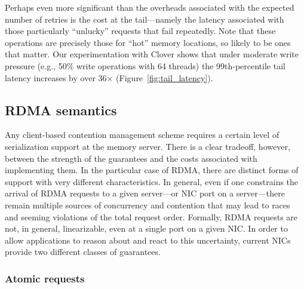 Perhaps even more significant than the overheads associated with the
expected number of retries is the cost at the tail---namely the
latency associated with those particularly ``unlucky'' requests that
fail repeatedly.  Note that these operations are precisely those for
``hot'' memory locations, so likely to be ones that matter.  Our
experimentation with Clover shows that under moderate write pressure
(e.g., 50\% write operations with 64 threads) the 99th-percentile tail
latency increases by over 36$\times$ (Figure~\ref{fig:tail_latency}).



\subsection{RDMA semantics}

Any client-based contention management scheme requires a certain level
of serialization support at the memory server.  There is a clear
tradeoff, however, between the strength of the guarantees and the
costs associated with implementing them.  In the particular case of
RDMA, there are distinct forms of support with very different
characteristics.  In general, even if one constrains the arrival of
RDMA requests to a given server---or NIC port on a server---there
remain multiple sources of concurrency and contention that may lead to
races and seeming violations of the total request order.
Formally, RDMA requests are not, in general, linearizable, even at a
single port on a given NIC.  In order to allow applications to reason
about and react to this uncertainty, current NICs provide two
different classes of guarantees.

\subsubsection{Atomic requests}

